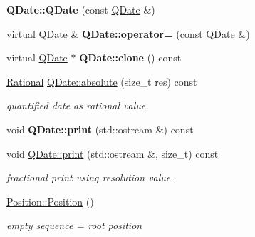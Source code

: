\begin{DoxyCompactItemize}
{\bfseries Q\+Date\+::\+Q\+Date} (const \mbox{\hyperlink{classQDate}{Q\+Date}} \&)
\item 
\mbox{\label{group__output_ga28238d09bb0f332bda66fafb92facb3b}} 
virtual \mbox{\hyperlink{classQDate}{Q\+Date}} \& {\bfseries Q\+Date\+::operator=} (const \mbox{\hyperlink{classQDate}{Q\+Date}} \&)
\item 
\mbox{\label{group__output_ga59599012a00e9c2ae587144f47085130}} 
virtual \mbox{\hyperlink{classQDate}{Q\+Date}} $\ast$ {\bfseries Q\+Date\+::clone} () const
\item 
\mbox{\label{group__output_ga07a4414576afc26204002ce92dcc7ce9}} 
\mbox{\hyperlink{classRational}{Rational}} \mbox{\hyperlink{group__output_ga07a4414576afc26204002ce92dcc7ce9}{Q\+Date\+::absolute}} (size\+\_\+t res) const
\begin{DoxyCompactList}\small\item\em quantified date as rational value. \end{DoxyCompactList}\item 
\mbox{\label{group__output_gac8e931429f0f79f9e9f5754d3b98fe36}} 
void {\bfseries Q\+Date\+::print} (std\+::ostream \&) const
\item 
\mbox{\label{group__output_gaf69eee7904ee41d76e3a1a61ab92cfd1}} 
void \mbox{\hyperlink{group__output_gaf69eee7904ee41d76e3a1a61ab92cfd1}{Q\+Date\+::print}} (std\+::ostream \&, size\+\_\+t) const
\begin{DoxyCompactList}\small\item\em fractional print using resolution value. \end{DoxyCompactList}\item 
\mbox{\label{group__output_ga369a577425f8ba02e8750d04b6a088db}} 
\mbox{\hyperlink{group__output_ga369a577425f8ba02e8750d04b6a088db}{Position\+::\+Position}} ()
\begin{DoxyCompactList}\small\item\em empty sequence = root position \end{DoxyCompactList}\item 
\mbox{\label{group__output_ga63750e368482cc5ef45180d3672b1c55}} 

\end{DoxyCompactItemize}
